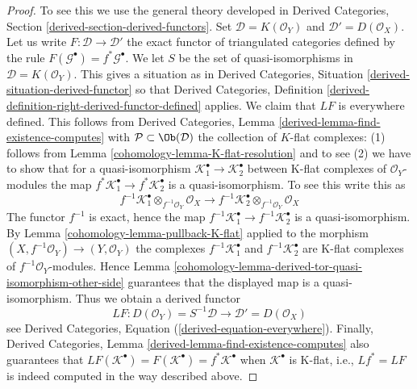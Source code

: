 \begin{proof}

To see this we use the general theory developed in
Derived Categories, Section \ref{derived-section-derived-functors}.
Set $\mathcal{D} = K(\mathcal{O}_Y)$ and $\mathcal{D}' = D(\mathcal{O}_X)$.
Let us write $F : \mathcal{D} \to \mathcal{D}'$ the exact functor
of triangulated categories defined by the rule
$F(\mathcal{G}^\bullet) = f^*\mathcal{G}^\bullet$.
We let $S$ be the set of quasi-isomorphisms in
$\mathcal{D} = K(\mathcal{O}_Y)$.
This gives a situation as in
Derived Categories, Situation \ref{derived-situation-derived-functor}
so that
Derived Categories, Definition
\ref{derived-definition-right-derived-functor-defined}
applies. We claim that $LF$ is everywhere defined.
This follows from
Derived Categories, Lemma \ref{derived-lemma-find-existence-computes}
with $\mathcal{P} \subset \Ob(\mathcal{D})$ the collection
of $K$-flat complexes: (1) follows from
Lemma \ref{cohomology-lemma-K-flat-resolution}
and to see (2) we have to show that for a quasi-isomorphism
$\mathcal{K}_1^\bullet  \to \mathcal{K}_2^\bullet$ between
K-flat complexes of $\mathcal{O}_Y$-modules the map
$f^*\mathcal{K}_1^\bullet  \to f^*\mathcal{K}_2^\bullet$ is a
quasi-isomorphism. To see this write this as
$$
f^{-1}\mathcal{K}_1^\bullet \otimes_{f^{-1}\mathcal{O}_Y} \mathcal{O}_X
\longrightarrow
f^{-1}\mathcal{K}_2^\bullet \otimes_{f^{-1}\mathcal{O}_Y} \mathcal{O}_X
$$
The functor $f^{-1}$ is exact, hence the map
$f^{-1}\mathcal{K}_1^\bullet  \to f^{-1}\mathcal{K}_2^\bullet$ is a
quasi-isomorphism. By
Lemma \ref{cohomology-lemma-pullback-K-flat}
applied to the morphism $(X, f^{-1}\mathcal{O}_Y) \to (Y, \mathcal{O}_Y)$
the complexes $f^{-1}\mathcal{K}_1^\bullet$ and $f^{-1}\mathcal{K}_2^\bullet$
are K-flat complexes of $f^{-1}\mathcal{O}_Y$-modules. Hence
Lemma \ref{cohomology-lemma-derived-tor-quasi-isomorphism-other-side}
guarantees that the displayed map is a quasi-isomorphism.
Thus we obtain a derived functor
$$
LF :
D(\mathcal{O}_Y) = S^{-1}\mathcal{D}
\longrightarrow
\mathcal{D}' = D(\mathcal{O}_X)
$$
see
Derived Categories, Equation (\ref{derived-equation-everywhere}).
Finally,
Derived Categories, Lemma \ref{derived-lemma-find-existence-computes}
also guarantees that
$LF(\mathcal{K}^\bullet) = F(\mathcal{K}^\bullet) = f^*\mathcal{K}^\bullet$
when $\mathcal{K}^\bullet$ is K-flat, i.e., $Lf^* = LF$ is
indeed computed in the way described above.
\end{proof}

